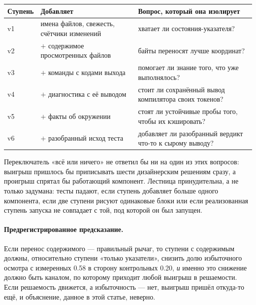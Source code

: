 \begin{center}
\begin{tabular}{@{}llp{7.2cm}@{}}
\toprule
Ступень & Добавляет & Вопрос, который она изолирует \\
\midrule
v1 & имена файлов, свежесть, счётчики изменений & хватает ли состояния-указателя? \\
v2 & $+$ содержимое просмотренных файлов        & байты переносят лучше координат? \\
v3 & $+$ команды с кодами выхода         & помогает ли знание того, что уже выполнялось? \\
v4 & $+$ диагностика с её выводом    & стоит ли сохранённый вывод компилятора своих токенов? \\
v5 & $+$ факты об окружении                & стоят ли устойчивые пробы того, чтобы их кэшировать? \\
v6 & $+$ разобранный исход теста              & добавляет ли разобранный вердикт что-то к сырому выводу? \\
\bottomrule
\end{tabular}
\end{center}

Переключатель «всё или ничего» не ответил бы ни на один из этих вопросов:
выигрыш пришлось бы приписывать шести дизайнерским решениям сразу, а проигрыш
спрятал бы работающий компонент. Лестница принудительна, а не только
задумана: тесты падают, если ступень добавляет больше одного компонента, если
две ступени рисуют одинаковые блоки или если реализованная ступень запуска не
совпадает с той, под которой он был запущен\code.

\paragraph{Предрегистрированное предсказание.} Если перенос содержимого —
правильный рычаг, то ступени с содержимым должны, относительно ступени
«только указатели», снизить долю избыточного осмотра с измеренных \num{0.58}
в сторону контрольных \num{0.20}, \emph{и} именно это снижение должно быть
каналом, по которому приходит любой выигрыш в решаемости. Если решаемость
движется, а избыточность — нет, выигрыш пришёл откуда-то ещё, и объяснение,
данное в этой статье, неверно.

